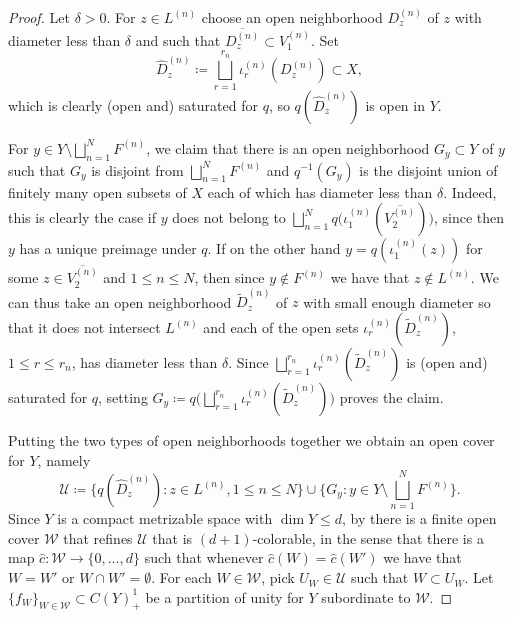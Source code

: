 \documentclass[11pt,a4paper]{amsart}
\theoremstyle{definition}
\numberwithin{equation}{section}
\begin{document}
\begin{proof}
Let $\delta>0$. For $z\in L^{(n)}$ choose an open neighborhood $D_z^{(n)}$ of $z$ with diameter less than $\delta$ and such that $\overline{D_z^{(n)}}\subset V_1^{(n)}$. Set
\begin{equation}
\hat{D}_z^{(n)}\coloneqq\bigsqcup_{r=1}^{r_n}\iota_r^{(n)}(D_z^{(n)}) \subset X,
\end{equation}
which is clearly (open and) saturated for $q$, so $q(\hat{D}_z^{(n)})$ is open in $Y$. 

For $y\in Y\setminus\bigsqcup_{n=1}^NF^{(n)}$, we claim that there is an open neighborhood $G_y\subset Y$ of $y$ such that $G_y$ is disjoint from $\bigsqcup_{n=1}^NF^{(n)}$ and $q^{-1}(G_y)$ is the disjoint union of finitely many open subsets of $X$ each of which has diameter less than $\delta$. Indeed, this is clearly the case if $y$ does not belong to $\bigsqcup_{n=1}^Nq\bigg(\iota_1^{(n)}(\overline{V_2^{(n)}})\bigg)$, since then $y$ has a unique preimage under $q$. If on the other hand $y=q(\iota_{1}^{(n)}(z))$ for some $z\in \overline{V_2^{(n)}}$ and $1\le n\le N$, then since $y\not\in F^{(n)}$ we have that $z\not\in L^{(n)}$. We can thus take an open neighborhood $\tilde{D}_z^{(n)}$ of $z$ with small enough diameter so that it does not intersect $L^{(n)}$ and each of the open sets $\iota_r^{(n)}(\tilde{D}_z^{(n)})$, $1\le r\le r_n$, has diameter less than $\delta$. Since $\bigsqcup_{r=1}^{r_n}\iota_r^{(n)}(\tilde{D}_z^{(n)})$ is (open and) saturated for $q$, setting $G_y\coloneqq q\big(\bigsqcup_{r=1}^{r_n}\iota_r^{(n)}(\tilde{D}_z^{(n)})\big)$ proves the claim.

Putting the two types of open neighborhoods together we obtain an open cover for $Y$, namely
\begin{equation}
\mathcal{U}\coloneqq \{q(\hat{D}_z^{(n)}):z\in L^{(n)}, 1\le n\le N\}\cup\bigg\{G_y: y\in Y\setminus\bigsqcup_{n=1}^NF^{(n)}\bigg\}.
\end{equation}
Since $Y$ is a compact metrizable space with $\dim Y\le d$, by \cite[Theorem~3.2.4]{Engelking78} there is a finite open cover $\mathcal{W}$ that refines $\mathcal{U}$ that is $(d+1)$-colorable, in the sense that there is a map $\hat{c}\colon \mathcal{W}\to \{0,\dots,d\}$ such that whenever $\hat{c}(W)=\hat{c}(W')$ we have that $W=W'$ or $W\cap W'= \emptyset$. For each $W\in\mathcal{W}$, pick $U_W\in\mathcal{U}$ such that $W\subset U_W$. Let $\{f_W\}_{W\in \mathcal{W}}\subset C(Y)_+^1$ be a partition of unity for $Y$ subordinate to $\mathcal{W}$. 


\end{proof}
\end{document}

